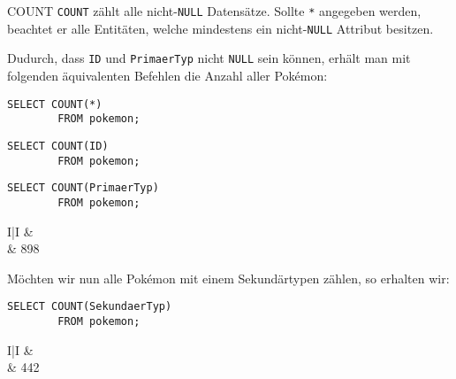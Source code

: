 \begin{sql}{COUNT}
    \texttt{COUNT} zählt alle nicht-\texttt{NULL} Datensätze.
    Sollte \texttt{*} angegeben werden, beachtet er alle Entitäten, welche mindestens ein nicht-\texttt{NULL} Attribut besitzen.

    Dudurch, dass \texttt{ID} und \texttt{PrimaerTyp} nicht \texttt{NULL} sein können, erhält man mit folgenden äquivalenten Befehlen die Anzahl aller Pokémon:

    \begin{lstlisting}[language=mysql]
        SELECT COUNT(*)
        FROM pokemon;
    \end{lstlisting}

    \begin{lstlisting}[language=mysql]
        SELECT COUNT(ID)
        FROM pokemon;
    \end{lstlisting}

    \begin{lstlisting}[language=mysql]
        SELECT COUNT(PrimaerTyp)
        FROM pokemon;
    \end{lstlisting}

    \setcounter{rownum}{0}
    \begin{tabular}{I|I}
        &  \\ & 898 \\
    \end{tabular}

    Möchten wir nun alle Pokémon mit einem Sekundärtypen zählen, so erhalten wir: 

    \begin{lstlisting}[language=mysql]
        SELECT COUNT(SekundaerTyp)
        FROM pokemon;
    \end{lstlisting}

    \setcounter{rownum}{0}
    \begin{tabular}{I|I}
        &  \\ & 442 \\
    \end{tabular}
\end{sql}

